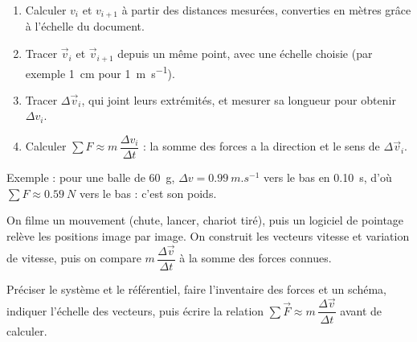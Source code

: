 \begin{savoirfaire}
\begin{enumerate}
\item Calculer $v_i$ et $v_{i+1}$ à partir des distances mesurées, converties en mètres grâce à l'échelle du document.
\item Tracer $\vec{v}_i$ et $\vec{v}_{i+1}$ depuis un même point, avec une échelle choisie (par exemple \qty{1}{cm} pour \qty{1}{m.s^{-1}}).
\item Tracer $\Delta\vec{v}_i$, qui joint leurs extrémités, et mesurer sa longueur pour obtenir $\Delta v_i$.
\item Calculer $\sum F\approx m\,\dfrac{\Delta v_i}{\Delta t}$ : la somme des forces a la direction et le sens de $\Delta\vec{v}_i$.
\end{enumerate}
Exemple : pour une balle de \qty{60}{g}, $\Delta v=\qty{0,99}{m.s^{-1}}$ vers le bas en \qty{0,10}{s}, d'où $\sum F\approx\qty{0,59}{N}$ vers le bas : c'est son poids.
\end{savoirfaire}
\begin{experience}
On filme un mouvement (chute, lancer, chariot tiré), puis un logiciel de pointage relève les positions image par image. On
construit les vecteurs vitesse et variation de vitesse, puis on compare $m\,\dfrac{\Delta\vec{v}}{\Delta t}$ à la somme des forces connues.
\end{experience}
\begin{rediger}
Préciser le système et le référentiel, faire l'inventaire des forces et un schéma, indiquer l'échelle des vecteurs, puis
écrire la relation $\sum\vec{F}\approx m\,\dfrac{\Delta\vec{v}}{\Delta t}$ avant de calculer.
\end{rediger}
\exercices

